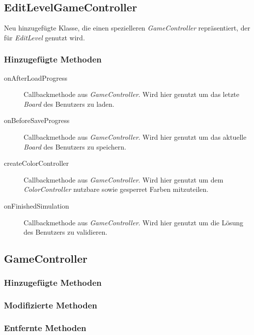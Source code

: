 \subsection{EditLevelGameController}
Neu hinzugefügte Klasse, die einen spezielleren \emph{GameController} repräsentiert, der für \emph{EditLevel} genutzt wird.

\subsubsection{Hinzugefügte Methoden}
\begin{description}
\item[onAfterLoadProgress]
Callbackmethode aus \emph{GameController}.
Wird hier genutzt um das letzte \emph{Board} des Benutzers zu laden.

\item[onBeforeSaveProgress]
Callbackmethode aus \emph{GameController}.
Wird hier genutzt um das aktuelle \emph{Board} des Benutzers zu speichern.

\item[createColorController]
Callbackmethode aus \emph{GameController}.
Wird hier genutzt um dem \emph{ColorController} nutzbare sowie gesperret Farben mitzuteilen.

\item[onFinishedSimulation]
Callbackmethode aus \emph{GameController}.
Wird hier genutzt um die Lösung des Benutzers zu validieren.

\end{description}


\subsection{GameController}

\subsubsection{Hinzugefügte Methoden}

\subsubsection{Modifizierte Methoden}

\subsubsection{Entfernte Methoden}



